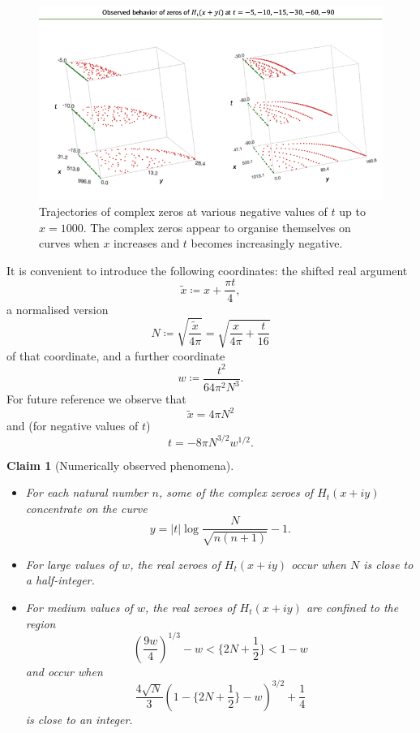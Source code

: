 \documentclass[a4paper,11pt,twoside]{amsart}
\newtheorem{claim}[theorem]{Claim}
\begin{document}
 \begin{figure}[h!]
  \includegraphics[width=0.8\linewidth]{traj_complexzeros.png}
  \caption{Trajectories of complex zeros at various negative values of $t$ up to $x=1000$. The complex zeros appear to organise themselves on curves when $x$ increases and $t$ becomes increasingly negative.}
  \label{fig:complexzeros}
\end{figure}


It is convenient to introduce the following coordinates: the shifted real argument
\begin{equation}\label{tx-def}
\tilde x \coloneqq x + \frac{\pi t}{4},
\end{equation}
a normalised version
\begin{equation}\label{n-def}
N \coloneqq \sqrt{\frac{\tilde x}{4\pi}} = \sqrt{\frac{x}{4\pi} + \frac{t}{16}}
\end{equation}
of that coordinate, and a further coordinate
$$ w \coloneqq \frac{t^2}{64\pi^2 N^3}.$$
For future reference we observe that
\begin{equation}\label{tx-form}
\tilde x = 4\pi N^2
\end{equation}
and (for negative values of $t$)
\begin{equation}\label{t-form}
t = - 8 \pi N^{3/2} w^{1/2}.
\end{equation}


\begin{claim}[Numerically observed phenomena]\label{nup}  
\begin{itemize}
\item[(i)]  For each natural number $n$, some of the complex zeroes of $H_t(x+iy)$ concentrate on the curve
\begin{equation}\label{yan}
 y = |t| \log \frac{N}{\sqrt{n(n+1)}} - 1.
\end{equation}
\item[(ii)]  For large values of $w$, the real zeroes of $H_t(x+iy)$ occur when $N$ is close to a half-integer.
\item[(iii)]  For medium values of $w$, the real zeroes of $H_t(x+iy)$ are confined to the region
$$ (\frac{9w}{4})^{1/3} - w < \{ 2N + \frac{1}{2}\} < 1-w $$
and occur when
$$ \frac{4 \sqrt{N}}{3} (1 - \{ 2N + \frac{1}{2}\} - w)^{3/2} + \frac{1}{4} $$
is close to an integer.
\end{itemize}
\end{claim}
\end{document}
